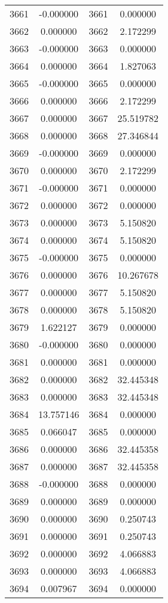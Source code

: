 \documentclass[12pt]{article}
\begin{document}
\begin{longtable}{@{}cccc@{}}
3661 & -0.000000 & 3661 & 0.000000 \\
3662 & 0.000000 & 3662 & 2.172299 \\
3663 & -0.000000 & 3663 & 0.000000 \\
3664 & 0.000000 & 3664 & 1.827063 \\
3665 & -0.000000 & 3665 & 0.000000 \\
3666 & 0.000000 & 3666 & 2.172299 \\
3667 & 0.000000 & 3667 & 25.519782 \\
3668 & 0.000000 & 3668 & 27.346844 \\
3669 & -0.000000 & 3669 & 0.000000 \\
3670 & 0.000000 & 3670 & 2.172299 \\
3671 & -0.000000 & 3671 & 0.000000 \\
3672 & 0.000000 & 3672 & 0.000000 \\
3673 & 0.000000 & 3673 & 5.150820 \\
3674 & 0.000000 & 3674 & 5.150820 \\
3675 & -0.000000 & 3675 & 0.000000 \\
3676 & 0.000000 & 3676 & 10.267678 \\
3677 & 0.000000 & 3677 & 5.150820 \\
3678 & 0.000000 & 3678 & 5.150820 \\
3679 & 1.622127 & 3679 & 0.000000 \\
3680 & -0.000000 & 3680 & 0.000000 \\
3681 & 0.000000 & 3681 & 0.000000 \\
3682 & 0.000000 & 3682 & 32.445348 \\
3683 & 0.000000 & 3683 & 32.445348 \\
3684 & 13.757146 & 3684 & 0.000000 \\
3685 & 0.066047 & 3685 & 0.000000 \\
3686 & 0.000000 & 3686 & 32.445358 \\
3687 & 0.000000 & 3687 & 32.445358 \\
3688 & -0.000000 & 3688 & 0.000000 \\
3689 & 0.000000 & 3689 & 0.000000 \\
3690 & 0.000000 & 3690 & 0.250743 \\
3691 & 0.000000 & 3691 & 0.250743 \\
3692 & 0.000000 & 3692 & 4.066883 \\
3693 & 0.000000 & 3693 & 4.066883 \\
3694 & 0.007967 & 3694 & 0.000000 \\

\end{longtable}
\end{document}
